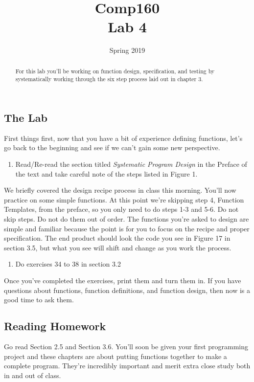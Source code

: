 \documentclass[nobib]{tufte-handout}
\title{Comp160 \\ Lab 4 }
\author{}
\date{ Spring 2019 }
\begin{document}
\maketitle

\begin{abstract}
  For this lab you'll be working on function design, specification, and testing by systematically working through the six step process laid out in chapter 3.
\end{abstract}

\subsection*{The Lab}

First things first, now that you have a bit of experience defining functions, let's go back to the beginning and see if we can't gain some new perspective.
\begin{enumerate}
  \item Read/Re-read  the section titled \textit{Systematic Program Design} in the Preface of the text and take careful note of the steps listed in Figure 1.
\end{enumerate}

We briefly covered the design recipe process in class this morning. You'll now practice on some simple functions. At this point we're skipping step 4, Function Templates, from the preface, so you only need to do steps 1-3 and 5-6.  Do not skip steps. Do not do them out of order.  The functions you're asked to design are simple and familiar because the point is for you to focus on the recipe and proper specification.  The end product should look the code you see in Figure 17 in section 3.5, but what you see will shift and change as you work the process.
\begin{enumerate}[resume]
  \item Do exercises 34 to 38 in section 3.2
\end{enumerate}
Once you've completed the exercises, print them and turn them in. If you have questions about functions, function definitions, and function design, then now is a good time to ask them.

\subsection*{Reading Homework}

Go read Section 2.5 and Section 3.6. You'll soon be given your first programming project and these chapters are about putting functions together to make a complete program. They're incredibly important and merit extra close study both in and out of class.
\end{document}
